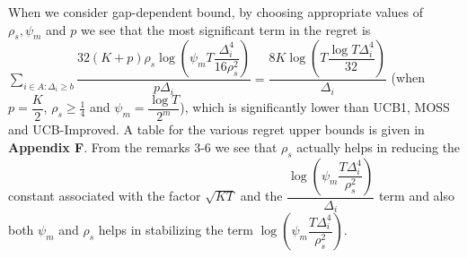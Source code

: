 \begin{remark}
	When we consider gap-dependent bound, by choosing appropriate values of $\rho_{s},\psi_{m}$ and $p$ we see that the most significant term in the regret is $\sum_{i\in A:\Delta_{i}\geq b}\dfrac{32(K+p)\rho_{s}\log{(\psi_{m}T\dfrac{\Delta_{i}^{4}}{16\rho_{s}^{2}})}}{p\Delta_{i}}= \dfrac{8K\log{(T\dfrac{\log T\Delta_{i}^{4}}{32})}}{\Delta_{i}}$ (when $p= \dfrac{K}{2}$, $\rho_{s} \geq \frac{1}{4}$ and $\psi_{m}=\dfrac{\log T}{2^{m}}$), which is significantly lower than UCB1, MOSS and UCB-Improved. A table for the various regret upper bounds is given in \textbf{Appendix F}. From the remarks $3$-$6$ we see that $\rho_{s}$ actually helps in reducing the constant associated with the factor $\sqrt{KT}$ and the $\dfrac{\log(\psi_{m}\dfrac{T\Delta_{i}^{4}}{\rho_{s}^{2}})}{\Delta_{i}}$ term and also both $\psi_{m}$ and $\rho_{s}$ helps in stabilizing the term $\log(\psi_{m}\dfrac{T\Delta_{i}^{4}}{\rho_{s}^{2}})$.
	
\end{remark}	



